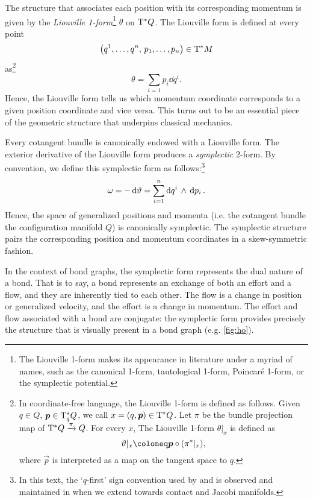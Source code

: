 The structure that associates each position with its corresponding momentum is given by the \emph{Liouville 1-form}\footnote
{
    The Liouville 1-form makes its appearance in literature under a myriad of names, such as the canonical 1-form, tautological 1-form, Poincaré 1-form, or the symplectic potential.
}
\(\theta\) on \(\mathrm{T}^*Q\). The Liouville form is defined at every point 
\[ \qty(q^1, \ldots, q^n,\, p_1, \ldots, p_n) \in \mathrm{T}^*M \] 
as\footnote
{
    In coordinate-free language, the Liouville 1-form is defined as follows. Given $q \in Q$, $\vec{p} \in \ctspace{q}{Q}$, we call $x = (q, \vec{p}) \in \ctbundle{Q}$. Let $\pi$ be the bundle projection map of $\mathrm{T}^*Q\xrightarrow[]{\pi}Q$. For every $x$, The Liouville 1-form $\theta\vert_x$ is defined as
    \begin{equation}
        \theta\vert_x \coloneq \vec{p} \circ \qty(\pi^*\vert_x),
    \end{equation}
    where $\vec{p}$ is interpreted as a map on the tangent space to $q$.
}
\begin{equation}
    \theta = \sum_{i = 1} p_i\dd{q^i}.
\end{equation}
Hence, the Liouville form tells us which momentum coordinate corresponds to a given position coordinate and vice versa. This turns out to be an essential piece of the geometric structure that underpins classical mechanics.

Every cotangent bundle is canonically endowed with a Liouville form. The exterior derivative of the Liouville form produces a \emph{symplectic} 2-form. By convention, we define this symplectic form as follows:\footnote
{
    In this text, the `\(q\)-first' sign convention used by \citet{Abraham1978} and \citet{Cannas2001} is observed and maintained in when we extend towards contact and Jacobi manifolds.
}
\begin{equation}
     \omega = -\dd{\vartheta} = \sum_{i = 1}^n  \dd{q^i}\,\wedge\,\dd{p_i} .
\end{equation}
Hence, the space of generalized positions and momenta (i.e. the cotangent bundle the configuration manifold \(Q\)) is canonically symplectic. The symplectic structure pairs the corresponding position and momentum coordinates in a skew-symmetric fashion.

In the context of bond graphs, the symplectic form represents the dual nature of a bond. That is to say, a bond represents an exchange of both an effort and a flow, and they are inherently tied to each other. The flow is a change in position or generalized velocity, and the effort is a change in momentum. The effort and flow associated with a bond are conjugate: the symplectic form provides precisely the structure that is visually present in a bond graph (e.g. \cref{fig:ho}).

